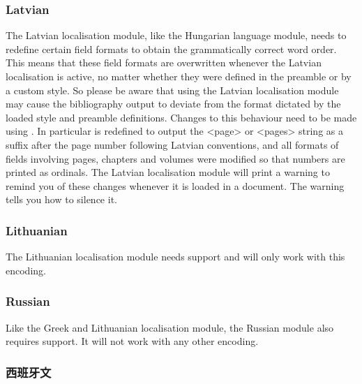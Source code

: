 \subsubsection{Latvian}
\label{use:loc:lav}

The Latvian localisation module, like the Hungarian language module, needs to redefine certain field formats to obtain the grammatically correct word order. This means that these field formats are overwritten whenever the Latvian localisation is active, no matter whether they were defined in the preamble or by a custom style. So please be aware that using the Latvian localisation module may cause the bibliography output to deviate from the format dictated by the loaded style and preamble definitions. Changes to this behaviour need to be made using . In particular  is redefined to output the <page> or <pages> string as a suffix after the page number following Latvian conventions, and all formats of fields involving pages, chapters and volumes were modified so that numbers are printed as ordinals. The Latvian localisation module will print a warning to remind you of these changes whenever it is loaded in a document. The warning tells you how to silence it.

\subsubsection{Lithuanian}
\label{use:loc:lit}

The Lithuanian localisation module needs \utf support and will only work with this encoding.

\subsubsection{Russian}
\label{use:loc:rus}

Like the Greek and Lithuanian localisation module, the Russian module also requires \utf support. It will not work with any other encoding.
\subsubsection{西班牙文}
\label{use:loc:esp}


